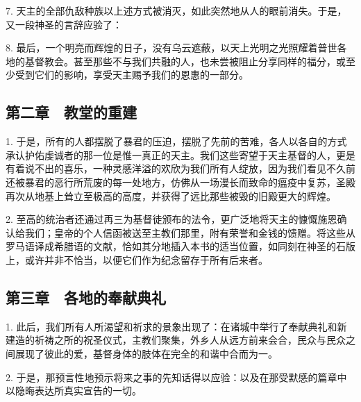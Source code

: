 7. 天主的全部仇敌种族以上述方式被消灭，如此突然地从人的眼前消失。于是，又一段神圣的言辞应验了：\par

8. 最后，一个明亮而辉煌的日子，没有乌云遮蔽，以天上光明之光照耀着普世各地的基督教会。甚至那些不与我们共融的人，也未尝被阻止分享同样的福分，或至少受到它们的影响，享受天主赐予我们的恩惠的一部分。\par


\subsection{第二章　教堂的重建}

1. 于是，所有的人都摆脱了暴君的压迫，摆脱了先前的苦难，各人以各自的方式承认护佑虔诚者的那一位是惟一真正的天主。我们这些寄望于天主基督的人，更是有着说不出的喜乐，一种灵感洋溢的欢欣为我们所有人绽放，因为我们看见不久前还被暴君的恶行所荒废的每一处地方，仿佛从一场漫长而致命的瘟疫中复苏，圣殿再次从地基上耸立至极高的高度，并获得了远比那些被毁的旧殿更大的辉煌。\par

2. 至高的统治者还通过再三为基督徒颁布的法令，更广泛地将天主的慷慨施恩确认给我们；皇帝的个人信函被送至主教们那里，附有荣誉和金钱的馈赠。将这些从罗马语译成希腊语的文献，恰如其分地插入本书的适当位置，如同刻在神圣的石版上，或许并非不恰当，以便它们作为纪念留存于所有后来者。\par


\subsection{第三章　各地的奉献典礼}

1. 此后，我们所有人所渴望和祈求的景象出现了：在诸城中举行了奉献典礼和新建造的祈祷之所的祝圣仪式，主教们聚集，外乡人从远方前来会合，民众与民众之间展现了彼此的爱，基督身体的肢体在完全的和谐中合而为一。\par

2. 于是，那预言性地预示将来之事的先知话得以应验：以及在那受默感的篇章中以隐晦表达所真实宣告的一切。\par

